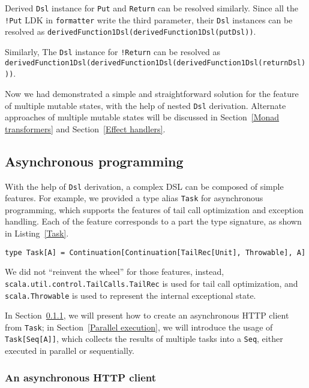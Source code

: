 Derived \lstinline{Dsl} instance for \lstinline{Put} and \lstinline{Return} can be resolved similarly. Since all the \lstinline{!Put} LDK in \lstinline{formatter} write the third parameter, their \lstinline{Dsl} instances can be resolved as \lstinline{derivedFunction1Dsl(derivedFunction1Dsl(putDsl))}.

Similarly, The \lstinline{Dsl} instance for \lstinline{!Return} can be resolved as \lstinline{derivedFunction1Dsl(derivedFunction1Dsl(derivedFunction1Dsl(returnDsl)))}.

Now we had demonstrated a simple and straightforward solution for the feature of multiple mutable states, with the help of nested \lstinline{Dsl} derivation. Alternate approaches of multiple mutable states will be discussed in Section~\ref{Monad transformers} and Section~\ref{Effect handlers}.


\subsection{Asynchronous programming}

With the help of \lstinline{Dsl} derivation, a complex DSL can be composed of simple features. For example, we provided a type alias \lstinline{Task} for asynchronous programming, which supports the features of tail call optimization and exception handling. Each of the feature corresponds to a part the type signature, as shown in Listing~\ref{Task}.

\begin{lstlisting}[caption={The definition of asynchronous \lstinline{Task}},label={Task}]
type Task[A] = Continuation[Continuation[TailRec[Unit], Throwable], A]
\end{lstlisting}

We did not ``reinvent the wheel'' for those features, instead, \lstinline{scala.util.control.TailCalls.TailRec} is used for tail call optimization, and \lstinline{scala.Throwable} is used to represent the internal exceptional state.

In Section~\ref{An asynchronous HTTP client}, we will present how to create an asynchronous HTTP client from \lstinline{Task}; in  Section~\ref{Parallel execution}, we will introduce the usage of \lstinline{Task[Seq[A]]}, which collects the results of multiple tasks into a \lstinline{Seq}, either executed in parallel or sequentially.

\subsubsection{An asynchronous HTTP client}\label{An asynchronous HTTP client}

